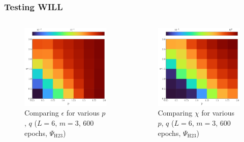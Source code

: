 \documentclass{beamer}
\begin{document}
\begin{frame}
\frametitle{Testing WILL}
\begin{columns}
\begin{column}{0.5\textwidth}
\begin{figure}
\centering 
\includegraphics[width=\textwidth]{im/eps_3_6_600}
\caption{Comparing $\epsilon$ for various $p$, $q$ ($L=6$, $m=3$, 600 epochs, $\Psi_\text{H23}$)}
\end{figure}
\end{column}
\begin{column}{0.5\textwidth}
\begin{figure}
\centering 
\includegraphics[width=\textwidth]{im/chi_3_6_600}
\caption{Comparing $\chi$ for various $p$, $q$ ($L=6$, $m=3$, 600 epochs, $\Psi_\text{H23}$)}
\end{figure}
\end{column}
\end{columns}
\end{frame}
\end{document}
